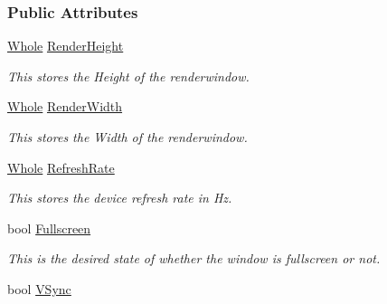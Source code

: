 \subsubsection*{Public Attributes}
\begin{DoxyCompactItemize}
\item 
\hypertarget{structphys_1_1GraphicsSettings_a82fe053e6276e29fbf473c3854bd4265}{
\hyperlink{namespacephys_a460f6bc24c8dd347b05e0366ae34f34a}{Whole} \hyperlink{structphys_1_1GraphicsSettings_a82fe053e6276e29fbf473c3854bd4265}{RenderHeight}}
\label{structphys_1_1GraphicsSettings_a82fe053e6276e29fbf473c3854bd4265}

\begin{DoxyCompactList}\small\item\em This stores the Height of the renderwindow. \item\end{DoxyCompactList}\item 
\hypertarget{structphys_1_1GraphicsSettings_a34226592a7e1ce7b0a2036afed00f239}{
\hyperlink{namespacephys_a460f6bc24c8dd347b05e0366ae34f34a}{Whole} \hyperlink{structphys_1_1GraphicsSettings_a34226592a7e1ce7b0a2036afed00f239}{RenderWidth}}
\label{structphys_1_1GraphicsSettings_a34226592a7e1ce7b0a2036afed00f239}

\begin{DoxyCompactList}\small\item\em This stores the Width of the renderwindow. \item\end{DoxyCompactList}\item 
\hypertarget{structphys_1_1GraphicsSettings_a510b666656f7d50532e9e8b37c3c429e}{
\hyperlink{namespacephys_a460f6bc24c8dd347b05e0366ae34f34a}{Whole} \hyperlink{structphys_1_1GraphicsSettings_a510b666656f7d50532e9e8b37c3c429e}{RefreshRate}}
\label{structphys_1_1GraphicsSettings_a510b666656f7d50532e9e8b37c3c429e}

\begin{DoxyCompactList}\small\item\em This stores the device refresh rate in Hz. \item\end{DoxyCompactList}\item 
\hypertarget{structphys_1_1GraphicsSettings_a64e9751b921685cac320650bd54e0a8e}{
bool \hyperlink{structphys_1_1GraphicsSettings_a64e9751b921685cac320650bd54e0a8e}{Fullscreen}}
\label{structphys_1_1GraphicsSettings_a64e9751b921685cac320650bd54e0a8e}

\begin{DoxyCompactList}\small\item\em This is the desired state of whether the window is fullscreen or not. \item\end{DoxyCompactList}\item 
\hypertarget{structphys_1_1GraphicsSettings_ade8df051b7da492f0b48014edfca532a}{
bool \hyperlink{structphys_1_1GraphicsSettings_ade8df051b7da492f0b48014edfca532a}{VSync}}
\label{structphys_1_1GraphicsSettings_ade8df051b7da492f0b48014edfca532a}


\end{DoxyCompactItemize}
